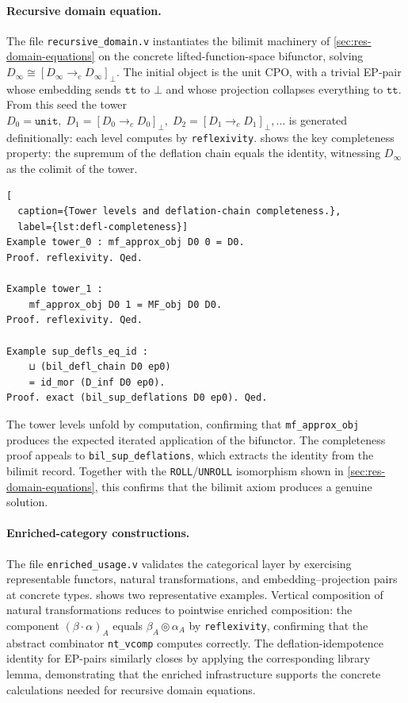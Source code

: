 \paragraph{Recursive domain equation.}
The file \texttt{recursive\_domain.v} instantiates the bilimit
machinery of \cref{sec:res-domain-equations} on the concrete
lifted-function-space bifunctor, solving
$D_\infty \cong [D_\infty \to_c D_\infty]_\bot$.
The initial object is the unit CPO, with a trivial EP-pair whose
embedding sends $\texttt{tt}$ to $\bot$ and whose projection collapses
everything to $\texttt{tt}$.
From this seed the tower
$D_0 = \texttt{unit},\; D_1 = [D_0 \to_c D_0]_\bot,\;
D_2 = [D_1 \to_c D_1]_\bot, \ldots$
is generated definitionally: each level computes by
\texttt{reflexivity}.
 shows the key completeness property:
the supremum of the deflation chain equals the identity,
witnessing $D_\infty$ as the colimit of the tower.

\begin{lstlisting}[
  caption={Tower levels and deflation-chain completeness.},
  label={lst:defl-completeness}]
Example tower_0 : mf_approx_obj D0 0 = D0.
Proof. reflexivity. Qed.

Example tower_1 :
    mf_approx_obj D0 1 = MF_obj D0 D0.
Proof. reflexivity. Qed.

Example sup_defls_eq_id :
    ⊔ (bil_defl_chain D0 ep0)
    = id_mor (D_inf D0 ep0).
Proof. exact (bil_sup_deflations D0 ep0). Qed.
\end{lstlisting}

The tower levels unfold by computation, confirming
that \texttt{mf\_approx\_obj} produces the expected iterated
application of the bifunctor.
The completeness proof appeals to \texttt{bil\_sup\_deflations}, which
extracts the identity from the bilimit record.
Together with the \texttt{ROLL}/\texttt{UNROLL} isomorphism shown in
\cref{sec:res-domain-equations}, this confirms that the bilimit axiom
produces a genuine solution.

\paragraph{Enriched-category constructions.}
The file \texttt{enriched\_usage.v} validates the categorical layer by
exercising representable functors, natural transformations, and
embedding--projection pairs at concrete types.
 shows two representative examples.
Vertical composition of natural transformations reduces to pointwise
enriched composition: the component
$(\beta \cdot \alpha)_A$ equals $\beta_A \circledcirc \alpha_A$ by
\texttt{reflexivity}, confirming that the abstract combinator
\texttt{nt\_vcomp} computes correctly.
The deflation-idempotence identity for EP-pairs similarly closes by
applying the corresponding library lemma, demonstrating that the
enriched infrastructure supports the concrete calculations
needed for recursive domain equations.

